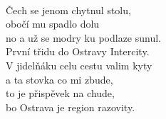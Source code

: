 {\begin{minipage}[t]{0.46 \textwidth}
{\\
Čech se jenom chytnul stolu,\\
obočí mu spadlo dolu\\
no a už se modry ku podlaze sunul.\\

První třidu do Ostravy Intercity.\\
V jidelňáku celu cestu valim kyty\\
a ta stovka co mi zbude,\\
to je přispěvek na chude,\\
bo Ostrava je region razovity.}
\end{minipage}
~\\
}

